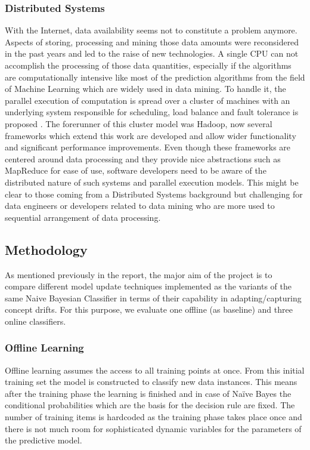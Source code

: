 \documentclass{article} %
\begin{document}
\subsubsection{Distributed Systems}
With the Internet, data availability seems not to constitute a problem anymore. Aspects of storing, processing and mining those data amounts were reconsidered in the past years and led to the raise of new technologies. A single CPU can not accomplish the processing of those data quantities, especially if the algorithms are computationally intensive like most of the prediction algorithms from the field of Machine Learning which are widely used in data mining. To handle it, the parallel execution of computation is spread over a cluster of machines with an underlying system responsible for scheduling, load balance and fault tolerance is proposed \cite[p. 10]{zaharia2010} . The forerunner of this cluster model was Hadoop, now several frameworks which extend this work are developed and allow wider functionality and significant performance improvements. Even though these frameworks are centered around data processing and they provide nice abstractions such as MapReduce for ease of use, software developers need to be aware of the distributed nature of such systems and parallel execution models. This might be clear to those coming from a Distributed Systems background but challenging for data engineers or developers related to data mining who are more used to sequential arrangement of data processing. 

\subsection{Methodology}
As mentioned previously in the report, the major aim of the project is to compare different model update techniques implemented as the variants of the same Naive Bayesian Classifier in terms of their capability in adapting/capturing concept drifts. For this purpose, we evaluate one offline (as baseline) and three online classifiers.

\subsubsection{Offline Learning}
Offline learning assumes the access to all training points at once. From this initial training set the model is constructed to classify new data instances. This means after the training phase the learning is finished and in case of Na\"ive Bayes  the conditional probabilities which are the basis for the decision rule are fixed. The number of training items is hardcoded as the training phase takes place once and there is not much room for sophisticated dynamic variables for the parameters of the predictive model.
\end{document}
